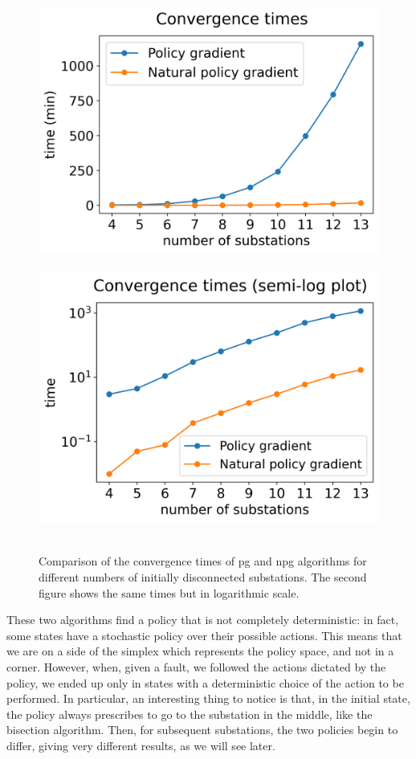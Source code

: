 \begin{figure}[ht]
    \centering
    \mbox{
        \hspace*{-15pt}\includegraphics[scale=0.52]{chapters/figures/times_graph.png}
        \hspace*{-5pt}\includegraphics[scale=0.52]{chapters/figures/times_graph_log.png}
    }
    \caption{Comparison of the convergence times of \acrshort{pg} and \acrshort{npg} algorithms for different numbers of initially disconnected substations. The second figure shows the same times but in logarithmic scale.}
    \label{fig:times}
\end{figure}

These two algorithms find a policy that is not completely deterministic: in fact, some states have a stochastic policy over their possible actions. This means that we are on a side of the simplex which represents the policy space, and not in a corner. However, when, given a fault, we followed the actions dictated by the policy, we ended up only in states with a deterministic choice of the action to be performed. In particular, an interesting thing to notice is that, in the initial state, the policy always prescribes to go to the substation in the middle, like the bisection algorithm. Then, for subsequent substations, the two policies begin to differ, giving very different results, as we will see later.

